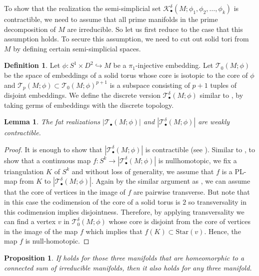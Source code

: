 \documentclass[a4paper]{amsart}
\newtheorem{prop}[thm]{Proposition}
\newtheorem{lem}[thm]{Lemma}
\theoremstyle{definition}
\newtheorem{defn}[thm]{Definition}
\theoremstyle{remark}
\numberwithin{equation}{section}
\begin{document}
To show that the realization the semi-simplicial set $\mathcal{K}^{\delta}_{\bullet}(M;\phi_1,\phi_2,\dots,\phi_k)$ is contractible, we need to assume that all prime manifolds in the prime decomposition of $M$ are irreducible. So let us first reduce to the case that this assumption holds. To secure this assumption, we need to cut out solid tori from $M$ by defining certain semi-simplicial spaces.
\begin{defn} Let $\phi: S^1\times D^2\hookrightarrow M$ be a $\pi_1$-injective embedding. Let $ \mathcal{T}_0(M;\phi)$  be the space of embeddings of a solid torus whose core is isotopic to the core of $\phi$ and $\mathcal{T}_p(M;\phi)\subset \mathcal{T}_0(M;\phi)^{p+1}$ is a subspace consisting of $p+1$ tuples of disjoint embeddings. We define the discrete version $\mathcal{T}^{\delta}_{\bullet}(M;\phi)$ similar to , by taking germs of embeddings with the discrete topology.
\end{defn} 
\begin{lem}\label{torus}
The fat realizations $|\mathcal{T}_{\bullet}(M;\phi)|$ and $|\mathcal{T}^{\delta}_{\bullet}(M;\phi)|$ are weakly contractible.
\end{lem}
\begin{proof}
It is enough to show that $|\mathcal{T}^{\delta}_{\bullet}(M;\phi)|$ is contractible (see ). Similar to , to show that a continuous map $f:S^k\to |\mathcal{T}^{\delta}_{\bullet}(M;\phi)|$ is nullhomotopic, we fix a triangulation $K$ of $S^k$ and without loss of generality, we assume that $f$ is a PL-map from $K$ to  $|\mathcal{T}^{\delta}_{\bullet}(M;\phi)|$. Again by the similar argument as , we can assume that the core of vertices in the image of $f$ are pairwise transverse. But note that in this case the codimension of the core of a solid torus is $2$ so transversality in this codimension implies disjointness. Therefore, by applying transversality we can find a vertex $v$ in $\mathcal{T}^{\delta}_{0}(M;\phi)$ whose core is disjoint from the core of vertices in the image of the map $f$ which implies that $f(K)\subset \text{Star}(v)$. Hence, the map $f$ is null-homotopic.
\end{proof}
\begin{prop}
If  holds for those three manifolds that are homeomorphic to a connected sum of irreducible manifolds, then it also holds for any three manifold.
\end{prop}
\end{document}
